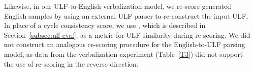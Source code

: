 Likewise, in our ULF-to-English verbalization model, we re-score generated English samples by using an external ULF parser to re-construct the input ULF. In place of a cycle consistency score, we use \elsmatch, which is described in Section~\ref{subsec:ulf-eval}, as a metric for ULF similarity during re-scoring. We did not construct an analogous re-scoring procedure for the English-to-ULF parsing model, as data from the verbalization experiment (Table~\ref{T3}) did not support the use of re-scoring in the reverse direction.